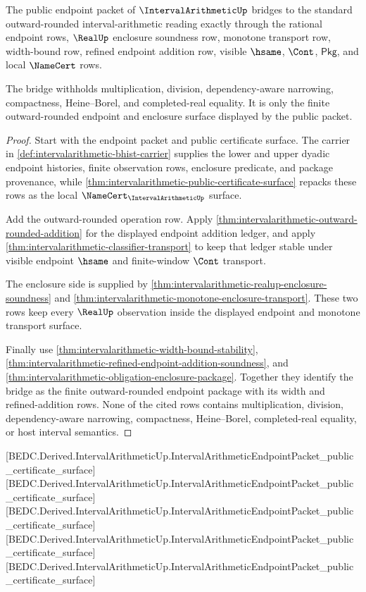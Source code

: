 \begin{theorem}
\label{thm:intervalarithmetic-standard-bridge}
The public endpoint packet of $\IntervalArithmeticUp$ bridges to the standard
outward-rounded interval-arithmetic reading exactly through the rational
endpoint rows, $\RealUp$ enclosure soundness row, monotone transport row,
width-bound row, refined endpoint addition row, visible $\hsame$, $\Cont$,
$\mathsf{Pkg}$, and local $\NameCert$ rows.

The bridge withholds multiplication, division, dependency-aware narrowing,
compactness, Heine--Borel, and completed-real equality. It is only the finite
outward-rounded endpoint and enclosure surface displayed by the public packet.
\end{theorem}
\begin{proof}
Start with the endpoint packet and public certificate surface. The carrier in
\autoref{def:intervalarithmetic-bhist-carrier} supplies the lower and upper
dyadic endpoint histories, finite observation rows, enclosure predicate, and
package provenance, while
\autoref{thm:intervalarithmetic-public-certificate-surface} repacks these rows
as the local $\NameCert_{\IntervalArithmeticUp}$ surface.

Add the outward-rounded operation row. Apply
\autoref{thm:intervalarithmetic-outward-rounded-addition} for the displayed
endpoint addition ledger, and apply
\autoref{thm:intervalarithmetic-classifier-transport} to keep that ledger
stable under visible endpoint $\hsame$ and finite-window $\Cont$ transport.

The enclosure side is supplied by
\autoref{thm:intervalarithmetic-realup-enclosure-soundness} and
\autoref{thm:intervalarithmetic-monotone-enclosure-transport}. These two rows
keep every $\RealUp$ observation inside the displayed endpoint and monotone
transport surface.

Finally use \autoref{thm:intervalarithmetic-width-bound-stability},
\autoref{thm:intervalarithmetic-refined-endpoint-addition-soundness}, and
\autoref{thm:intervalarithmetic-obligation-enclosure-package}. Together they
identify the bridge as the finite outward-rounded endpoint package with its
width and refined-addition rows. None of the cited rows contains
multiplication, division, dependency-aware narrowing, compactness,
Heine--Borel, completed-real equality, or host interval semantics.
\end{proof}

[BEDC.Derived.IntervalArithmeticUp.IntervalArithmeticEndpointPacket\_public\_certificate\_surface]
[BEDC.Derived.IntervalArithmeticUp.IntervalArithmeticEndpointPacket\_public\_certificate\_surface]
[BEDC.Derived.IntervalArithmeticUp.IntervalArithmeticEndpointPacket\_public\_certificate\_surface]
[BEDC.Derived.IntervalArithmeticUp.IntervalArithmeticEndpointPacket\_public\_certificate\_surface]
[BEDC.Derived.IntervalArithmeticUp.IntervalArithmeticEndpointPacket\_public\_certificate\_surface]

